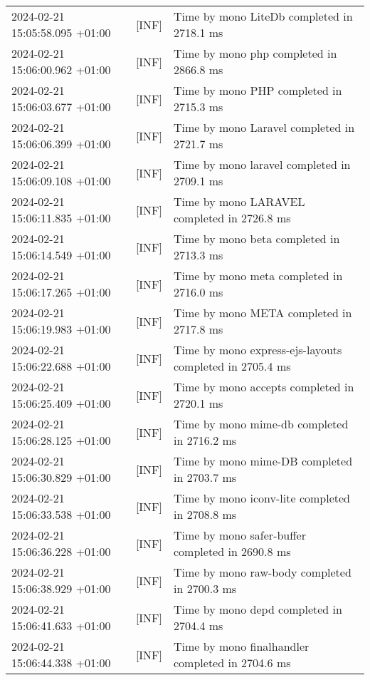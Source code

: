 {{\begin{tabularx}{\textwidth}{|l|l|X|}
                    2024-02-21 15:05:58.095 +01:00 & [INF] & Time by mono LiteDb completed in 2718.1 ms \\
                    2024-02-21 15:06:00.962 +01:00 & [INF] & Time by mono php completed in 2866.8 ms \\
                    2024-02-21 15:06:03.677 +01:00 & [INF] & Time by mono PHP completed in 2715.3 ms \\
                    2024-02-21 15:06:06.399 +01:00 & [INF] & Time by mono Laravel completed in 2721.7 ms \\
                    2024-02-21 15:06:09.108 +01:00 & [INF] & Time by mono laravel completed in 2709.1 ms \\
                    2024-02-21 15:06:11.835 +01:00 & [INF] & Time by mono LARAVEL completed in 2726.8 ms \\
                    2024-02-21 15:06:14.549 +01:00 & [INF] & Time by mono beta completed in 2713.3 ms \\
                    2024-02-21 15:06:17.265 +01:00 & [INF] & Time by mono meta completed in 2716.0 ms \\
                    2024-02-21 15:06:19.983 +01:00 & [INF] & Time by mono META completed in 2717.8 ms \\
                    2024-02-21 15:06:22.688 +01:00 & [INF] & Time by mono express-ejs-layouts completed in 2705.4 ms \\
                    2024-02-21 15:06:25.409 +01:00 & [INF] & Time by mono accepts completed in 2720.1 ms \\
                    2024-02-21 15:06:28.125 +01:00 & [INF] & Time by mono mime-db completed in 2716.2 ms \\
                    2024-02-21 15:06:30.829 +01:00 & [INF] & Time by mono mime-DB completed in 2703.7 ms \\
                    2024-02-21 15:06:33.538 +01:00 & [INF] & Time by mono iconv-lite completed in 2708.8 ms \\
                    2024-02-21 15:06:36.228 +01:00 & [INF] & Time by mono safer-buffer completed in 2690.8 ms \\
                    2024-02-21 15:06:38.929 +01:00 & [INF] & Time by mono raw-body completed in 2700.3 ms \\
                    2024-02-21 15:06:41.633 +01:00 & [INF] & Time by mono depd completed in 2704.4 ms \\
                    2024-02-21 15:06:44.338 +01:00 & [INF] & Time by mono finalhandler completed in 2704.6 ms \\

\end{tabularx}}}
